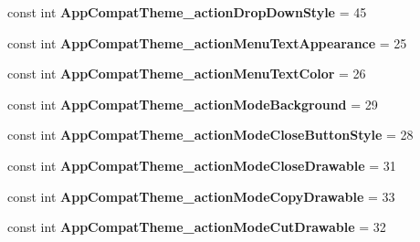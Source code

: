 \begin{DoxyCompactItemize}
const int {\bfseries App\+Compat\+Theme\+\_\+action\+Drop\+Down\+Style} = 45
\item 
\mbox{\label{class_sample_app_1_1_droid_1_1_resource_1_1_styleable_a8ad4e02c7c8ee690e9a9a3c2e74d48a4}} 
const int {\bfseries App\+Compat\+Theme\+\_\+action\+Menu\+Text\+Appearance} = 25
\item 
\mbox{\label{class_sample_app_1_1_droid_1_1_resource_1_1_styleable_a8cc30298d6bd62b42a3073593fe77f94}} 
const int {\bfseries App\+Compat\+Theme\+\_\+action\+Menu\+Text\+Color} = 26
\item 
\mbox{\label{class_sample_app_1_1_droid_1_1_resource_1_1_styleable_acd5ca952b6993135e6c926992c304d30}} 
const int {\bfseries App\+Compat\+Theme\+\_\+action\+Mode\+Background} = 29
\item 
\mbox{\label{class_sample_app_1_1_droid_1_1_resource_1_1_styleable_adefbcef4d3b2286d03819f9803852f36}} 
const int {\bfseries App\+Compat\+Theme\+\_\+action\+Mode\+Close\+Button\+Style} = 28
\item 
\mbox{\label{class_sample_app_1_1_droid_1_1_resource_1_1_styleable_a1173ec1f8de8ce1dbff411b96690b387}} 
const int {\bfseries App\+Compat\+Theme\+\_\+action\+Mode\+Close\+Drawable} = 31
\item 
\mbox{\label{class_sample_app_1_1_droid_1_1_resource_1_1_styleable_a36b347be13a65ca3c7067e783cc531bf}} 
const int {\bfseries App\+Compat\+Theme\+\_\+action\+Mode\+Copy\+Drawable} = 33
\item 
\mbox{\label{class_sample_app_1_1_droid_1_1_resource_1_1_styleable_ad51c7da821b5b421f12f674a319ec24d}} 
const int {\bfseries App\+Compat\+Theme\+\_\+action\+Mode\+Cut\+Drawable} = 32
\item 
\mbox{\label{class_sample_app_1_1_droid_1_1_resource_1_1_styleable_acf0f149486c7ac95a8123fade9485390}} 

\end{DoxyCompactItemize}
